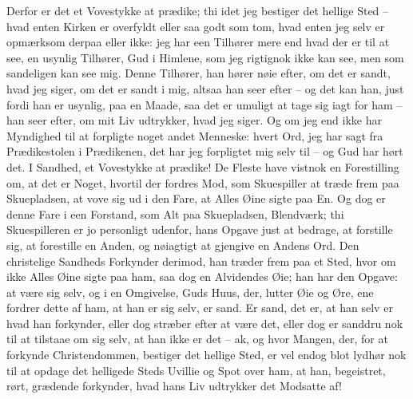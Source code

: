 \documentclass[12pt,a4paper]{article}
\begin{document}
Derfor er det et Vovestykke at prædike; thi idet jeg bestiger det hellige Sted – hvad enten Kirken er overfyldt eller saa godt som tom, hvad enten jeg selv er opmærksom derpaa eller ikke: jeg har een Tilhører mere end hvad der er til at see, en usynlig Tilhører, Gud i Himlene, som jeg rigtignok ikke kan see, men som sandeligen kan see mig. Denne Tilhører, han hører nøie efter, om det er sandt, hvad jeg siger, om det er sandt i mig, altsaa han seer efter – og det kan han, just fordi han er usynlig, paa en Maade, saa det er umuligt at tage sig iagt for ham – han seer efter, om mit Liv udtrykker, hvad jeg siger. Og om jeg end ikke har Myndighed til at forpligte noget andet Menneske: hvert Ord, jeg har sagt fra Prædikestolen i Prædikenen, det har jeg forpligtet mig selv til – og Gud har hørt det. I Sandhed, et Vovestykke at prædike! De Fleste have vistnok en Forestilling om, at det er Noget, hvortil der fordres Mod, som Skuespiller at træde frem paa Skuepladsen, at vove sig ud i den Fare, at Alles Øine sigte paa En. Og dog er denne Fare i een Forstand, som Alt paa Skuepladsen, Blendværk; thi Skuespilleren er jo personligt udenfor, hans Opgave just at bedrage, at forstille sig, at forestille en Anden, og nøiagtigt at gjengive en Andens Ord. Den christelige Sandheds Forkynder derimod, han træder frem paa et Sted, hvor om ikke Alles Øine sigte paa ham, saa dog en Alvidendes Øie; han har den Opgave: at være sig selv, og i en Omgivelse, Guds Huus, der, lutter Øie og Øre, ene fordrer dette af ham, at han er sig selv, er sand. Er sand, det er, at han selv er hvad han forkynder, eller dog stræber efter at være det, eller dog er sanddru nok til at tilstaae om sig selv, at han ikke er det – ak, og hvor Mangen, der, for at forkynde Christendommen, bestiger det hellige Sted, er vel endog blot lydhør nok til at opdage det helligede Steds Uvillie og Spot over ham, at han, begeistret, rørt, grædende forkynder, hvad hans Liv udtrykker det Modsatte af!
\end{document}
